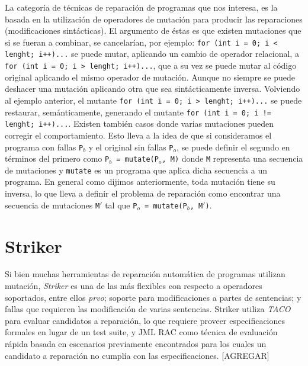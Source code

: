 La categor\'ia de t\'ecnicas de reparaci\'on de programas que nos interesa, es la basada en la utilizaci\'on de operadores de mutaci\'on para producir las reparaciones (modificaciones sint\'acticas). El argumento de \'estas es que existen mutaciones que si se fueran a combinar, se cancelar\'ian, por ejemplo:
\lstinline|for (int i = 0; i < lenght; i++)...| se puede mutar, aplicando un cambio de operador relacional, a \lstinline|for (int i = 0; i > lenght; i++)...|, que a su vez se puede mutar al c\'odigo original aplicando el mismo operador de mutaci\'on. Aunque no siempre se puede deshacer una mutaci\'on aplicando otra que sea sint\'acticamente inversa. Volviendo al ejemplo anterior, el mutante \lstinline|for (int i = 0; i > lenght; i++)...| se puede restaurar, sem\'anticamente, generando el mutante \lstinline|for (int i = 0; i != lenght; i++)...|. Existen tambi\'en casos donde varias mutaciones pueden corregir el comportamiento. Esto lleva a la idea de que si consideramos el programa con fallas \texttt{P$_b$} y el original sin fallas \texttt{P$_o$}, se puede definir el segundo en t\'erminos del primero como \texttt{P$_b$ = mutate(P$_o$, M)} donde \texttt{M} representa una secuencia de mutaciones y \texttt{mutate} es un programa que aplica dicha secuencia a un programa. En general como dijimos anteriormente, toda mutaci\'on tiene su inversa, lo que lleva a definir el problema de reparaci\'on como encontrar una secuencia de mutaciones \texttt{M$\prime$} tal que \texttt{P$_o$ = mutate(P$_b$, M$\prime$)}.

\section{Striker}
\label{sec:preliminares.repair.striker}

Si bien muchas herramientas de reparaci\'on autom\'atica de programas utilizan mutaci\'on, \emph{Striker} es una de las m\'as flexibles con respecto a operadores soportados, entre ellos \emph{prvo}; soporte para modificaciones a partes de sentencias; y fallas que requieren las modificaci\'on de varias sentencias. Striker utiliza \emph{TACO} \cite{bibliography.mutation.tools.TACOGaleottiRPF13} para evaluar candidatos a reparaci\'on, lo que requiere proveer especificaciones formales en lugar de un test suite, y JML RAC \cite{bibliography.misc.JMLRAC.LeavensCCRC02} como t\'ecnica de evaluaci\'on r\'apida basada en escenarios previamente encontrados para los cuales un candidato a reparaci\'on no cumpl\'ia con las especificaciones. [AGREGAR]